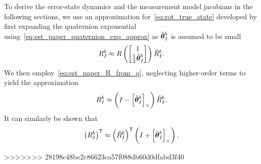 To derive the error-state dynamics and the measurement model jacobians in the
following sections, we
use an approximation for~\eqref{eq:rot_true_state} developed by first expanding
the
quaternion exponential using~\eqref{eq:est_paper_quaternion_exp_approx} as
$\tilde{\boldsymbol{\mathrm{\theta}}}_I^b$ is assumed to be small
\begin{equation}
  R_I^b  \approx R \left( \begin{bmatrix}
      1 \\
    \frac{1}{2} \tilde{\boldsymbol{\mathrm{\theta}}}_I^b
  \end{bmatrix}\right)
  \hat{R}_I^b.
\end{equation}
We then employ~\eqref{eq:est_paper_R_from_q}, neglecting higher-order terms to
yield the approximation
\begin{equation}
  R_I^b  \approx 
  \left( I - \left[ \tilde{\boldsymbol{\mathrm{\theta}}}_I^b \right]_{\times} \right)
  \hat{R}_I^b.
  \label{eq:est_paper_Rapprox}
\end{equation}
It can similarly be shown that
\begin{equation}
  \left( R_I^b \right)^{\mathsf{T}}  \approx 
  \left( \hat{R}_I^b \right)^{\mathsf{T}}
  \left( I + \left[ \tilde{\boldsymbol{\mathrm{\theta}}}_I^b \right]_{\times} \right).
  \label{eq:est_paper_RTapprox}
\end{equation}

>>>>>>> 28198c48be2c86623ca57f088db60d0dfabd3f40


